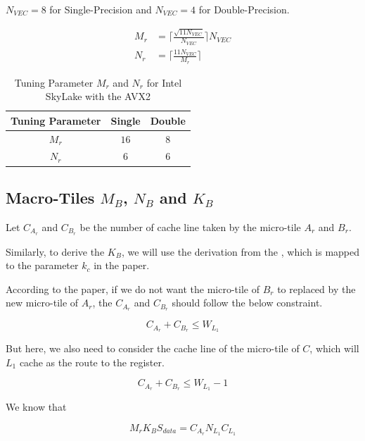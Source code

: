 $N_{VEC} = 8$ for Single-Precision and $N_{VEC} = 4$ for Double-Precision.

\begin{align*}
    M_r &= \lceil \frac{ \sqrt{11 N_{VEC}} }{N_{VEC}} \rceil N_{VEC} \\
    N_r &= \lceil \frac{ 11 N_{VEC} }{M_r} \rceil
\end{align*}

\begin{table}[ht]
    \centering
    \caption{Tuning Parameter $M_r$ and $N_r$ for Intel SkyLake with the AVX2}
    \begin{tabular}{|c|c|c|}
        \hline
        \textbf{Tuning Parameter} & \textbf{Single} & \textbf{Double}\\
        \hline
        $M_r$   & $16$ & $8$ \\
        \hline
        $N_r$   & $6$ & $6$ \\
        \hline
    \end{tabular}
\end{table}

\subsection{Macro-Tiles $M_B$, $N_B$ and $K_B$}

Let $C_{A_r}$ and $C_{B_r}$ be the number of cache line taken by the micro-tile $A_r$ and $B_r$.

Similarly, to derive the $K_B$, we will use the derivation from the \cite{BLIS}, which is 
mapped to the parameter $k_c$ in the paper.

According to the paper, if we do not want the micro-tile of $B_r$ 
to replaced by the new micro-tile of $A_r$, the $C_{A_r}$ and $C_{B_r}$  should 
follow the below constraint.

\[C_{A_r} + C_{B_r} \leq W_{L_1}\]

But here, we also need to consider the cache line of the micro-tile of $C$, which will $L_1$
cache as the route to the register.

\begin{equation}
    C_{A_r} + C_{B_r} \leq W_{L_1} - 1
    \label{eq:mtm_tuning_CAr_CBr}
\end{equation}

We know that

\begin{equation}
    M_r K_B S_{data} = C_{A_r} N_{L_1} C_{L_1}
    \label{eq:mtm_tuning_KB_CAr}
\end{equation}

